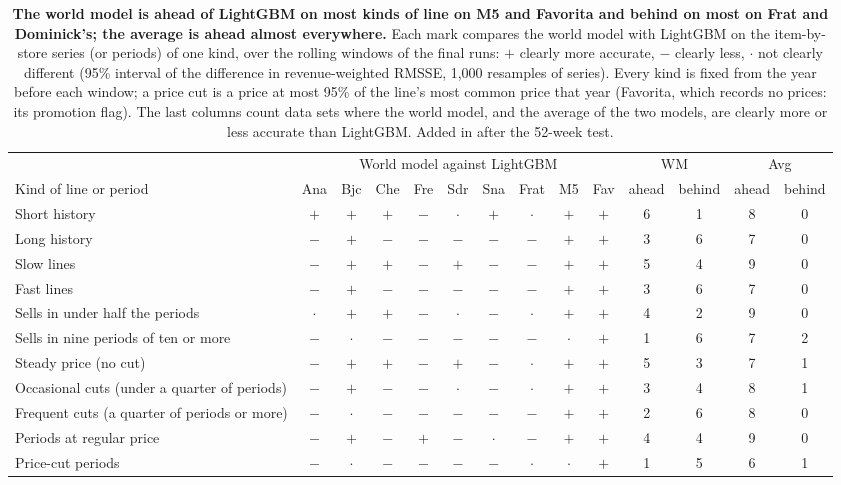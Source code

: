 \begin{table}[t]
\centering
\caption{\textbf{The world model is ahead of LightGBM on most kinds of line on M5 and Favorita and behind on most on
Frat and Dominick's; the average is ahead almost everywhere.} Each mark compares the world model with LightGBM on the item-by-store series (or periods)
of one kind, over the rolling windows of the final runs: $+$ clearly more accurate, $-$ clearly less, $\cdot$ not
clearly different (95\% interval of the difference in revenue-weighted RMSSE, 1,000 resamples of series). Every kind is
fixed from the year before each window; a price cut is a price at most 95\% of the line's most common price that year
(Favorita, which records no prices: its promotion flag). The last columns count data sets where the world model, and
the average of the two models, are clearly more or less accurate than LightGBM. Added in \thisrev{} after the 52-week
test.}
\label{tab:rq-kinds}
\footnotesize\setlength{\tabcolsep}{3.5pt}
\begin{tabular}{lccccccccccccc}
\toprule
 & \multicolumn{9}{c}{World model against LightGBM} & \multicolumn{2}{c}{WM} & \multicolumn{2}{c}{Avg} \\
\cmidrule(lr){2-10}\cmidrule(lr){11-12}\cmidrule(lr){13-14}
Kind of line or period & Ana & Bjc & Che & Fre & Sdr & Sna & Frat & M5 & Fav & ahead & behind & ahead & behind \\
\midrule
Short history & $+$ & $+$ & $+$ & $-$ & $\cdot$ & $+$ & $\cdot$ & $+$ & $+$ & 6 & 1 & 8 & 0 \\
Long history & $-$ & $+$ & $-$ & $-$ & $-$ & $-$ & $-$ & $+$ & $+$ & 3 & 6 & 7 & 0 \\
Slow lines & $-$ & $+$ & $+$ & $-$ & $+$ & $-$ & $-$ & $+$ & $+$ & 5 & 4 & 9 & 0 \\
Fast lines & $-$ & $+$ & $-$ & $-$ & $-$ & $-$ & $-$ & $+$ & $+$ & 3 & 6 & 7 & 0 \\
Sells in under half the periods & $\cdot$ & $+$ & $+$ & $-$ & $\cdot$ & $-$ & $\cdot$ & $+$ & $+$ & 4 & 2 & 9 & 0 \\
Sells in nine periods of ten or more & $-$ & $\cdot$ & $-$ & $-$ & $-$ & $-$ & $-$ & $\cdot$ & $+$ & 1 & 6 & 7 & 2 \\
Steady price (no cut) & $-$ & $+$ & $+$ & $-$ & $+$ & $-$ & $\cdot$ & $+$ & $+$ & 5 & 3 & 7 & 1 \\
Occasional cuts (under a quarter of periods) & $-$ & $+$ & $-$ & $-$ & $\cdot$ & $-$ & $\cdot$ & $+$ & $+$ & 3 & 4 & 8 & 1 \\
Frequent cuts (a quarter of periods or more) & $-$ & $\cdot$ & $-$ & $-$ & $-$ & $-$ & $-$ & $+$ & $+$ & 2 & 6 & 8 & 0 \\
Periods at regular price & $-$ & $+$ & $-$ & $+$ & $-$ & $\cdot$ & $-$ & $+$ & $+$ & 4 & 4 & 9 & 0 \\
Price-cut periods & $-$ & $\cdot$ & $-$ & $-$ & $-$ & $-$ & $\cdot$ & $\cdot$ & $+$ & 1 & 5 & 6 & 1 \\
\bottomrule
\end{tabular}
\end{table}
